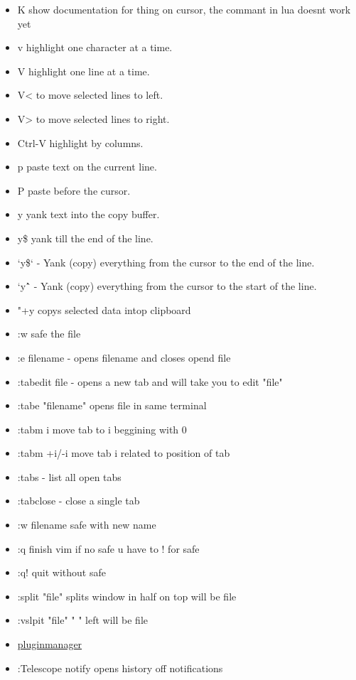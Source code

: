 \documentclass[12pt]{article}
\begin{document}
\begin{itemize}
    \item K show documentation for thing on cursor, the commant in lua doesnt work yet 
    \item v highlight one character at a time.
    \item V highlight one line at a time.
    \item V< to move selected lines to left.
    \item V> to move selected lines to right.
    \item Ctrl-V highlight by columns.
    \item p paste text on the current line.
    \item P paste before the cursor.
    \item y yank text into the copy buffer.
    \item y\$ yank till the end of the line.
    \item `y\$` - Yank (copy) everything from the cursor to the end of the line.
    \item `y\^` - Yank (copy) everything from the cursor to the start of the line.\\
    \item "+y copys selected data intop clipboard \\
\end{itemize}
\begin{itemize}
    \item :w  safe the file
    \item :e filename - opens filename and closes opend file
    \item :tabedit file - opens a new tab and will take you to edit "file"
    \item :tabe "filename" opens file in same terminal 
    \item :tabm i move tab to i beggining with 0
    \item :tabm +i/-i move tab i related to position of tab
    \item :tabs - list all open tabs
    \item :tabclose - close a single tab
    \item :w filename safe with new name
    \item :q finish vim if no safe u have to ! for safe
    \item :q! quit without safe
    \item :split "file" splits window in half on top will be file
    \item :vslpit "file" "                      " left will be file
    \item \href{https://github.com/junegunn/vim-plug}{pluginmanager}
    \item :Telescope notify opens history off notifications

\end{itemize}
\end{document}
